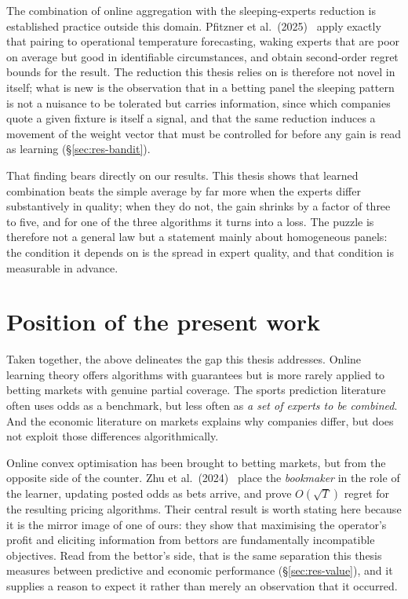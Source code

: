 \documentclass[12pt,a4paper,oneside]{report}
\renewcommand{\_}{\oldunderscore\allowbreak}
\theoremstyle{definition}
\theoremstyle{plain}
\theoremstyle{definition}   %
\begin{document}
The combination of online aggregation with the sleeping-experts reduction is established
practice outside this domain. Pfitzner et al.\ (2025)~\cite{pfitzner2025} apply exactly that pairing to operational
temperature forecasting, waking experts that are poor on average but good in identifiable
circumstances, and obtain second-order regret bounds for the result. The reduction this thesis
relies on is therefore not novel in itself; what is new is the observation that in a betting
panel the sleeping pattern is not a nuisance to be tolerated but carries information, since
which companies quote a given fixture is itself a signal, and that the same reduction induces a
movement of the weight vector that must be controlled for before any gain is read as learning
(\S\ref{sec:res-bandit}).

That finding bears directly on our results. This thesis shows that learned combination beats
the simple average by far more when the experts differ substantively in quality; when they do
not, the gain shrinks by a factor of three to five, and for one of the three algorithms it turns
into a loss. The puzzle is therefore not a general law but a statement mainly about homogeneous
panels: the condition it depends on is the spread in expert quality, and that condition is
measurable in advance.

\section{Position of the present work}

Taken together, the above delineates the gap this thesis addresses. Online learning theory
offers algorithms with guarantees but is more rarely applied to betting markets with genuine
partial coverage. The sports prediction literature often uses odds as a benchmark, but less
often as \emph{a set of experts to be combined}. And the economic literature on markets
explains why companies differ, but does not exploit those differences algorithmically.

Online convex optimisation has been brought to betting markets, but from the opposite side of
the counter. Zhu et al.\ (2024)~\cite{zhu2024} place the \emph{bookmaker} in the role of the learner, updating
posted odds as bets arrive, and prove $O(\sqrt{T})$ regret for the resulting pricing
algorithms. Their central result is worth stating here because it is the mirror image of one of
ours: they show that maximising the operator's profit and eliciting information from bettors
are fundamentally incompatible objectives. Read from the bettor's side, that is the same
separation this thesis measures between predictive and economic performance
(\S\ref{sec:res-value}), and it supplies a reason to expect it rather than merely an
observation that it occurred.
\end{document}
